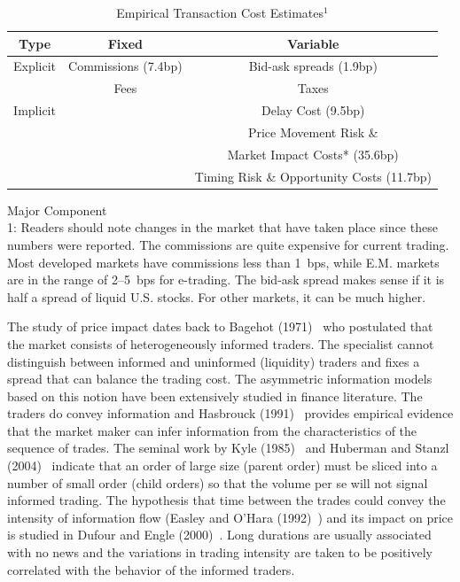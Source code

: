	\begin{table}[!ht]
	\caption{Empirical Transaction Cost Estimates$^1$\label{tab:empttrans}}	
	\begin{tabular}{|c|c|c|}
	Type & Fixed & Variable \\ \hline 
	Explicit & Commissions (7.4bp) & Bid-ask spreads (1.9bp) \\ \hline
	& Fees & Taxes \\ \hline 
	Implicit & & Delay Cost (9.5bp) \\ \hline
	& & Price Movement Risk \& \\
	& & Market Impact Costs* (35.6bp) \\ \hline
	& & Timing Risk \& Opportunity Costs (11.7bp) \\  
	\end{tabular}
	{\small *Major Component \\ 1: Readers should note changes in the market that have taken place since these numbers were reported. The commissions are quite expensive for current trading. Most developed markets  have commissions less than 1~bps, while E.M. markets are in the range of 2--5~bps for e-trading. The bid-ask spread makes sense if it is half a spread of liquid U.S. stocks. For other markets, it can be much higher.}
	\end{table}


The study of price impact dates back to Bagehot (1971)~\cite{bagehot} who postulated that the market consists of heterogeneously informed traders. The specialist cannot distinguish between informed and uninformed (liquidity) traders and fixes a spread that can balance the trading cost. The asymmetric information models based on this notion have been extensively studied in finance literature. The traders do convey information and Hasbrouck (1991)~\cite{hasbrouk} provides empirical evidence that the market maker can infer information from the characteristics of the sequence of trades. The seminal work by Kyle (1985)~\cite{kyle1985} and Huberman and Stanzl (2004)~\cite{huberstan} indicate that an order of large size (parent order) must be sliced into a number of small order (child orders) so that the volume per se will not signal informed trading. The hypothesis that time between the trades could convey the intensity of information flow (Easley and O'Hara (1992)~\cite{easleyo}) and its impact on price is studied in Dufour and Engle (2000)~\cite{dufour}. Long durations are usually associated with no news and the variations in trading intensity are taken to be positively correlated with the behavior of the informed traders. \twomedskip


